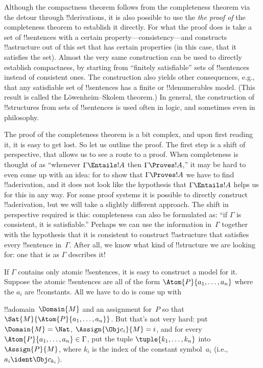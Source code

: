 Although the compactness theorem follows from the completeness theorem
via the detour through !!{derivation}s, it is also possible to use the
\emph{the proof of} the completeness theorem to establish it
directly. For what the proof does is take a set of !!{sentence}s with
a certain property---consistency---and constructs !!a{structure} out
of this set that has certain properties (in this case, that it
satisfies the set). Almost the very same construction can be used to
directly establish compactness, by starting from ``finitely
satisfiable'' sets of !!{sentence}s instead of consistent ones.
The construction also yields other consequences, e.g.,
  that any satisfiable set of !!{sentence}s has a finite or
  !!{denumerable}s model.  (This result is called the
  L\"owenheim--Skolem theorem.)  In general, the construction of
  !!{structure}s from sets of !!{sentence}s is used often in logic,
  and sometimes even in philosophy.







The proof of the completeness theorem is a bit complex, and upon first
reading it, it is easy to get lost.  So let us outline the proof.  The
first step is a shift of perspective, that allows us to see a route to
a proof.  When completeness is thought of as ``whenever $\Gamma
\Entails !A$ then $\Gamma \Proves !A$,'' it may be hard to even come
up with an idea: for to show that $\Gamma \Proves !A$ we have to find
!!a{derivation}, and it does not look like the hypothesis that
$\Gamma \Entails !A$ helps us for this in any way.  For some proof
systems it is possible to directly construct !!a{derivation}, but we
will take a slightly different approach.  The shift in perspective
required is this: completeness can also be formulated as: ``if
$\Gamma$ is consistent, it is satisfiable.''  Perhaps we can use the
information in~$\Gamma$ together with the hypothesis that it is
consistent to construct !!a{structure}
that satisfies every !!{sentence}
in~$\Gamma$.  After all, we know
what kind of !!{structure} we are looking
for: one that is as $\Gamma$ describes it!{}

If $\Gamma$ contains only atomic
  !!{sentence}s, it is easy to construct
a model for it. Suppose the atomic !!{sentence}s are all
  of the form $\Atom{P}{a_1,\dots,a_n}$ where the $a_i$ are
  !!{constant}s. All we have to do is come up with

  !!a{domain}~$\Domain{M}$ and an assignment for~$P$ so that
  $\Sat{M}{\Atom{P}{a_1,\ldots,a_n}}$. But that's not very hard:
  put $\Domain{M} = \Nat$, $\Assign{\Obj c_i}{M} = i$, and for every
  $\Atom{P}{a_1,\ldots,a_n} \in \Gamma$, put the tuple $\tuple{k_1,
    \dots, k_n}$ into $\Assign{P}{M}$, where $k_i$ is the index of the
  constant symbol~$a_i$ (i.e., $a_i \ident \Obj c_{k_i}$).

